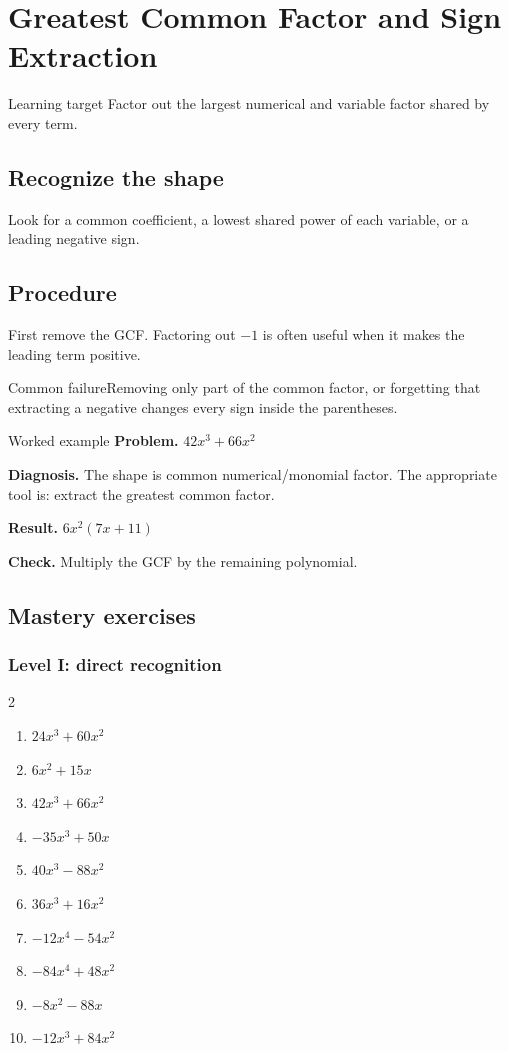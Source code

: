 \documentclass[11pt,oneside]{book}
\begin{document}
\chapter{Greatest Common Factor and Sign Extraction}
\begin{rulebox}{Learning target}
Factor out the largest numerical and variable factor shared by every term.
\end{rulebox}
\section{Recognize the shape}
Look for a common coefficient, a lowest shared power of each variable, or a leading negative sign.
\section{Procedure}
First remove the GCF. Factoring out $-1$ is often useful when it makes the leading term positive.

\begin{warningbox}{Common failure}Removing only part of the common factor, or forgetting that extracting a negative changes every sign inside the parentheses.\end{warningbox}
\begin{examplebox}{Worked example}
\textbf{Problem.} $ 42 x^{3} + 66 x^{2} $

\textbf{Diagnosis.} The shape is common numerical/monomial factor. The appropriate tool is: extract the greatest common factor.

\textbf{Result.} $ 6 x^{2} \left(7 x + 11\right) $

\textbf{Check.} Multiply the GCF by the remaining polynomial.
\end{examplebox}
\section{Mastery exercises}
\subsection*{Level I: direct recognition}
\begin{multicols}{2}
\begin{enumerate}[leftmargin=*,label=\textbf{\arabic*.},itemsep=0.65\baselineskip]
\item $ 24 x^{3} + 60 x^{2} $
\item $ 6 x^{2} + 15 x $
\item $ 42 x^{3} + 66 x^{2} $
\item $ - 35 x^{3} + 50 x $
\item $ 40 x^{3} - 88 x^{2} $
\item $ 36 x^{3} + 16 x^{2} $
\item $ - 12 x^{4} - 54 x^{2} $
\item $ - 84 x^{4} + 48 x^{2} $
\item $ - 8 x^{2} - 88 x $
\item $ - 12 x^{3} + 84 x^{2} $
\end{enumerate}
\end{multicols}
\end{document}
